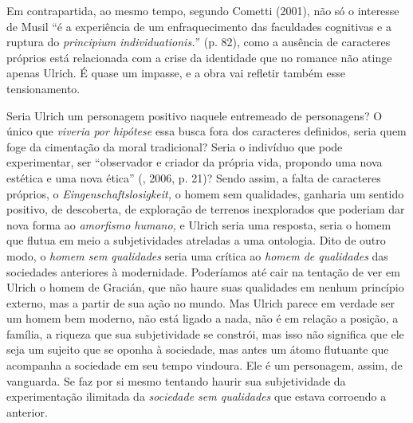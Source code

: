 Em contrapartida, ao mesmo tempo, segundo Cometti (2001), não só o
interesse de Musil ``é a experiência de um enfraquecimento das
faculdades cognitivas e a ruptura do \emph{principium}
\emph{individuationis.}'' (p. 82), como a ausência de caracteres
próprios está relacionada com a crise da identidade que no romance não
atinge apenas Ulrich. É quase um impasse, e a obra vai refletir também
esse tensionamento.

Seria Ulrich um personagem positivo naquele entremeado de personagens? O
único que \emph{viveria por hipótese} essa busca fora dos caracteres
definidos, seria quem foge da cimentação da moral tradicional? Seria o
indivíduo que pode experimentar, ser ``observador e criador da própria
vida, propondo uma nova estética e uma nova ética'' (, 2006, p.
21)? Sendo assim, a falta de caracteres próprios, o
\emph{Eingenschaftslosigkeit,} o homem sem qualidades, ganharia um
sentido positivo, de descoberta, de exploração de terrenos inexplorados
que poderiam dar nova forma ao \emph{amorfismo humano,} e Ulrich seria
uma resposta, seria o homem que flutua em meio a subjetividades
atreladas a uma ontologia. Dito de outro modo, o \emph{homem sem
qualidades} seria uma crítica ao \emph{homem de qualidades} das
sociedades anteriores à modernidade. Poderíamos até cair na tentação de
ver em Ulrich o homem de Gracián, que não haure suas qualidades em
nenhum princípio externo, mas a partir de sua ação no mundo. Mas Ulrich
parece em verdade ser um homem bem moderno, não está ligado a nada, não
é em relação a posição, a família, a riqueza que sua subjetividade se
constrói, mas isso não significa que ele seja um sujeito que se oponha à
sociedade, mas antes um átomo flutuante que acompanha a sociedade em
seu tempo vindoura. Ele é um personagem, assim, de vanguarda.
Se faz por si mesmo tentando haurir sua subjetividade da experimentação
ilimitada da \emph{sociedade sem qualidades} que estava corroendo a
anterior.

